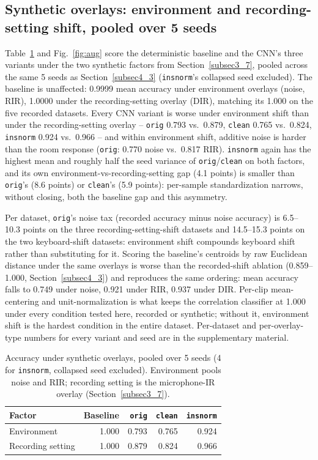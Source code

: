 \documentclass[pdflatex,sn-mathphys-num,iicol]{sn-jnl}
\theoremstyle{thmstyleone}
\theoremstyle{thmstyletwo}
\theoremstyle{thmstylethree}
\begin{document}
\subsection{Synthetic overlays: environment and recording-setting shift, pooled over 5 seeds}\label{subsec4_5}

Table~\ref{tab:aug} and Fig.~\ref{fig:aug} score the deterministic baseline and the CNN's three variants under the two synthetic factors from Section~\ref{subsec3_7}, pooled across the same 5 seeds as Section~\ref{subsec4_3} (\texttt{insnorm}'s collapsed seed excluded). The baseline is unaffected: 0.9999 mean accuracy under environment overlays (noise, RIR), 1.0000 under the recording-setting overlay (DIR), matching its 1.000 on the five recorded datasets. Every CNN variant is worse under environment shift than under the recording-setting overlay -- \texttt{orig} 0.793 vs.\ 0.879, \texttt{clean} 0.765 vs.\ 0.824, \texttt{insnorm} 0.924 vs.\ 0.966 -- and within environment shift, additive noise is harder than the room response (\texttt{orig}: 0.770 noise vs.\ 0.817 RIR). \texttt{insnorm} again has the highest mean and roughly half the seed variance of \texttt{orig}/\texttt{clean} on both factors, and its own environment-vs-recording-setting gap (4.1 points) is smaller than \texttt{orig}'s (8.6 points) or \texttt{clean}'s (5.9 points): per-sample standardization narrows, without closing, both the baseline gap and this asymmetry.

Per dataset, \texttt{orig}'s noise tax (recorded accuracy minus noise accuracy) is 6.5--10.3 points on the three recording-setting-shift datasets and 14.5--15.3 points on the two keyboard-shift datasets: environment shift compounds keyboard shift rather than substituting for it. Scoring the baseline's centroids by raw Euclidean distance under the same overlays is worse than the recorded-shift ablation (0.859--1.000, Section~\ref{subsec4_3}) and reproduces the same ordering: mean accuracy falls to 0.749 under noise, 0.921 under RIR, 0.937 under DIR. Per-clip mean-centering and unit-normalization is what keeps the correlation classifier at 1.000 under every condition tested here, recorded or synthetic; without it, environment shift is the hardest condition in the entire dataset. Per-dataset and per-overlay-type numbers for every variant and seed are in the supplementary material.

\begin{table}[htbp]
\caption{Accuracy under synthetic overlays, pooled over 5 seeds (4 for \texttt{insnorm}, collapsed seed excluded). Environment pools noise and RIR; recording setting is the microphone-IR overlay (Section~\ref{subsec3_7}).}\label{tab:aug}
\begin{tabular}{@{}lrrrr@{}}
\toprule
Factor & Baseline & \texttt{orig} & \texttt{clean} & \texttt{insnorm} \\
\midrule
Environment & 1.000 & 0.793 & 0.765 & 0.924 \\
Recording setting & 1.000 & 0.879 & 0.824 & 0.966 \\
\bottomrule
\end{tabular}
\end{table}
\end{document}
